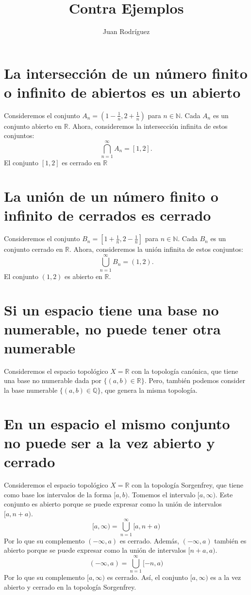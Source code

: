 \documentclass[12pt]{article}
\title{Contra Ejemplos}
\author{Juan Rodríguez}
\date{}
\begin{document}
\maketitle
\section*{La intersección de un número finito o infinito de abiertos es un abierto}
Consideremos el conjunto \( A_n = \left( 1 -\frac{1}{n}, 2 + \frac{1}{n} \right) \) para \( n \in \mathbb{N} \). Cada \( A_n \) es un conjunto abierto en \( \mathbb{R} \). Ahora, consideremos la intersección infinita de estos conjuntos:
\[ \bigcap_{n=1}^{\infty} A_n = [1,2]. \]
El conjunto \( [1,2] \) es cerrado en \( \mathbb{R} \)
\section*{La unión de un número finito o infinito de cerrados es cerrado}
Consideremos el conjunto \( B_n = \left[ 1 +\frac{1}{n}, 2 - \frac{1}{n} \right] \) para \( n \in \mathbb{N} \). Cada \( B_n \) es un conjunto cerrado en \( \mathbb{R} \). Ahora, consideremos la unión infinita de estos conjuntos:
\[ \bigcup_{n=1}^{\infty} B_n = (1,2). \]
El conjunto \( (1,2) \) es abierto en \( \mathbb{R} \).
\section*{Si un espacio tiene una base no numerable, no puede tener otra numerable}
Consideremos el espacio topológico \( X = \mathbb{R} \) con la topología canónica, que tiene una base no numerable dada por \(\{(a,b) \in \mathbb{R}\}\). Pero, también podemos consider la base numerable \(\{(a,b) \in \mathbb{Q}\}\), que genera la misma topología.
\section*{En un espacio el mismo conjunto no puede ser a la vez abierto y cerrado}
Consideremos el espacio topológico \( X = \mathbb{R} \) con la topología Sorgenfrey, que tiene como base los intervalos de la forma \([a,b)\).
Tomemos el intervalo \([a, \infty)\).
Este conjunto es abierto porque se puede expresar como la unión de intervalos \([a, n+a)\).
\[
[a, \infty) = \bigcup_{n=1}^{\infty} [a, n+a)
\]
Por lo que su complemento \((-\infty, a)\) es cerrado.
Además, \((-\infty, a)\) también es abierto porque se puede expresar como la unión de intervalos \([n+a, a)\).
\[(-\infty, a) = \bigcup_{n=1}^{\infty} [-n, a)\]
Por lo que su complemento \([a, \infty)\) es cerrado.
Así, el conjunto \([a, \infty)\) es a la vez abierto y cerrado en la topología Sorgenfrey.
\end{document}
